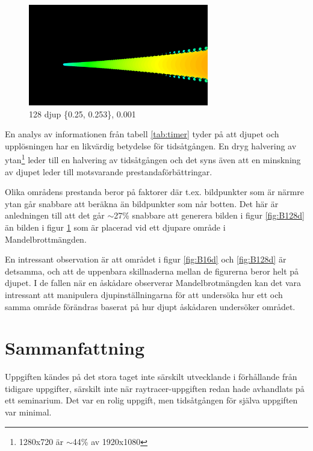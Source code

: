 \documentclass[a4paper, 11pt]{article}
\begin{document}
\begin{figure}[h!]
  \centering
    \includegraphics[width=0.7\textwidth]{1080p128zonea}
  \caption{128 djup \{0.25, 0.253\}, 0.001}
  \label{fig:A128d}
\end{figure}

En analys av informationen från tabell \ref{tab:timer} tyder på att djupet och upplösningen har en likvärdig betydelse för tidsåtgången. En dryg halvering av ytan\footnote{1280x720 är $\sim$44\% av 1920x1080} leder till en halvering av tidsåtgången och det syns även att en minskning av djupet leder till motsvarande prestandaförbättringar.

Olika områdens prestanda beror på faktorer där t.ex. bildpunkter som är närmre ytan går snabbare att beräkna än bildpunkter som når botten. Det här är anledningen till att det går $\sim$27\% snabbare att generera bilden i figur \ref{fig:B128d} än bilden i figur \ref{fig:A128d} som är placerad vid ett djupare område i Mandelbrottmängden.

En intressant observation är att området i figur \ref{fig:B16d} och \ref{fig:B128d} är detsamma, och att de uppenbara skillnaderna mellan de figurerna beror helt på djupet. I de fallen när en åskådare observerar Mandelbrotmängden kan det vara intressant att manipulera djupinställningarna för att undersöka hur ett och samma område förändras baserat på hur djupt åskådaren undersöker området.

\section{Sammanfattning}
Uppgiften kändes på det stora taget inte särskilt utvecklande i förhållande från tidigare uppgifter, särskilt inte när raytracer-uppgiften redan hade avhandlats på ett seminarium. Det var en rolig uppgift, men tidsåtgången för själva uppgiften var minimal.
\end{document}
